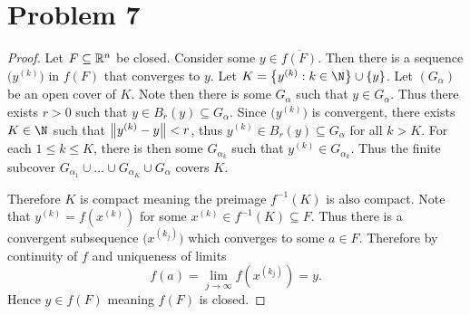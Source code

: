 \documentclass{eeleyes}
\newcommand\conj[1]{\overline{#1}}
\begin{document}
\section*{Problem 7}
\begin{proof}
    Let $F \subseteq \mathbb{R}^n$ be closed. Consider some $y \in \conj{f(F)}$. Then there is a sequence $\bigl(y^{(k)}\bigr)$ in $f(F)$ that converges to $y$. Let $K = \qty{y^{(k)} : k \in \N} \cup \qty{y}$. Let $(G_{\alpha})$ be an open cover of $K$. Note then there is some $G_{\alpha}$ such that $y \in G_{\alpha}$. Thus there exists $r > 0$ such that $y \in B_r(y) \subseteq G_{\alpha}$. Since $\bigl(y^{(k)}\bigr)$ is convergent, there exists $K \in \N$ such that $\norm{y^{(k)} - y} < r$, thus $y^{(k)} \in B_r(y) \subseteq G_{\alpha}$ for all $k > K$. For each $1 \leq k \leq K$, there is then some $G_{\alpha_k}$ such that $y^{(k)} \in G_{\alpha_k}$. Thus the finite subcover $G_{\alpha_1} \cup \ldots \cup G_{\alpha_K} \cup G_{\alpha}$ covers $K$. 

    Therefore $K$ is compact meaning the preimage $f^{-1}(K)$ is also compact. Note that $y^{(k)} = f(x^{(k)})$ for some $x^{(k)} \in f^{-1}(K) \subseteq F$. Thus there is a convergent subsequence $\bigl( x^{(k_j)} \bigr)$ which converges to some $a \in F$. Therefore by continuity of $f$ and uniqueness of limits
    \[
        f(a) = \displaystyle\lim_{j \to \infty} f(x^{(k_j)}) = y
    .\]
    Hence $y \in f(F)$ meaning $f(F)$ is closed.
\end{proof}
\end{document}
